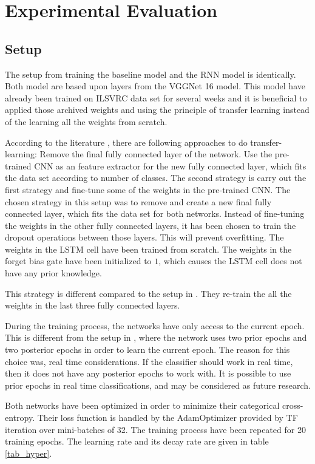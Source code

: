 
\section{Experimental Evaluation}
\subsection{Setup}


The setup from training the baseline model and the RNN model is identically. Both model are based upon layers from the VGGNet 16 model. This model have already been trained on ILSVRC data set for several weeks and it is beneficial to applied those archived weights and using the principle of transfer learning instead of the learning all the weights from scratch. 

According to the literature \cite{stand_cnn_notes_1}, there are following approaches to do transfer-learning: Remove the final fully connected layer of the network. Use the pre-trained CNN as an feature extractor for the new fully connected layer, which fits the data set according to number of classes. The second strategy is carry out the first strategy and fine-tune some of the weights in the pre-trained CNN.
The chosen strategy in this setup was to remove and create a new final fully connected layer, which fits the data set for both networks. Instead of fine-tuning the weights in the other fully connected layers, it has been chosen to train the dropout operations between those layers. This will prevent overfitting. 
The weights in the LSTM cell have been trained from scratch. The weights in the forget bias gate have been initialized to $1$, which causes the LSTM cell does not have any prior knowledge.

This strategy is different compared to the setup in \cite{main_ar}. They re-train the all the weights in the last three fully connected layers.

During the training process, the networks have only access to the current epoch. This is different from the setup in \cite{main_ar}, where the network uses two prior epochs and two posterior epochs in order to learn the current epoch. The reason for this choice was, real time considerations. If the classifier should work in real time, then it does not have any posterior epochs to work with. It is possible to use prior epochs in real time classifications, and may be considered as future research.

Both networks have been optimized in order to minimize their categorical cross-entropy. Their loss function is handled by the AdamOptimizer provided by TF iteration over mini-batches of 32. The training process have been repeated for 20 training epochs. The learning rate and its decay rate are given in table \ref{tab_hyper}.

